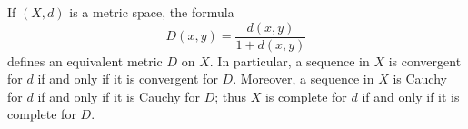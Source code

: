 If $(X, d)$ is a metric space, the formula
$$D(x, y) = \frac{d(x, y)}{1 + d(x, y)}$$
defines an equivalent metric $D$ on $X$. In particular, a sequence in $X$ is convergent for $d$ if and only if it is convergent for $D$. Moreover, a sequence in $X$ is Cauchy for $d$ if and only if it is Cauchy for $D$; thus $X$ is complete for $d$ if and only if it is complete for $D$.
